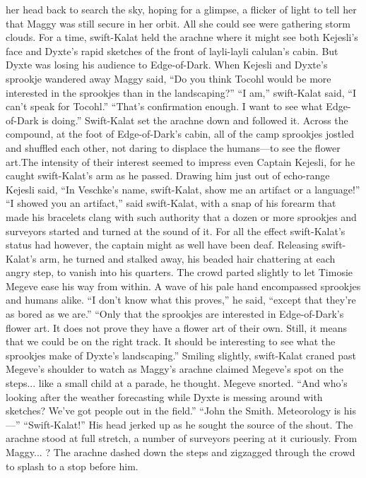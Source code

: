 \documentclass[9pt]{article}
\begin{document}
her head back to search the sky, hoping for a glimpse, a flicker of light to tell her that Maggy was still
secure in her orbit. All she could see were gathering storm clouds.
For a time, swift-Kalat held the arachne where it might see both Kejesli’s face and Dyxte’s rapid
sketches of the front of layli-layli calulan’s cabin. But Dyxte was losing his audience to Edge-of-Dark.
When Kejesli and Dyxte’s sprookje wandered away Maggy said, “Do you think Tocohl would be
more interested in the sprookjes than in the landscaping?”
“I am,” swift-Kalat said, “I can’t speak for Tocohl.”
“That’s confirmation enough. I want to see what Edge-of-Dark is doing.”
Swift-Kalat set the arachne down and followed it.
Across the compound, at the foot of Edge-of-Dark’s cabin, all of the camp sprookjes jostled and
shuffled each other, not daring to displace the humans—to see the flower art.The intensity of their interest seemed to impress even Captain Kejesli, for he caught swift-Kalat’s
arm as he passed. Drawing him just out of echo-range Kejesli said, “In Veschke’s name, swift-Kalat,
show me an artifact or a language!”
“I showed you an artifact,” said swift-Kalat, with a snap of his forearm that made his bracelets clang
with such authority that a dozen or more sprookjes and surveyors started and turned at the sound of it.
For all the effect swift-Kalat’s status had however, the captain might as well have been deaf. Releasing
swift-Kalat’s arm, he turned and stalked away, his beaded hair chattering at each angry step, to vanish
into his quarters.
The crowd parted slightly to let Timosie Megeve ease his way from within. A wave of his pale hand
encompassed sprookjes and humans alike. “I don’t know what this proves,” he said, “except that they’re
as bored as we are.”
“Only that the sprookjes are interested in Edge-of-Dark’s flower art. It does not prove they have a
flower art of their own. Still, it means that we could be on the right track. It should be interesting to see
what the sprookjes make of Dyxte’s landscaping.” Smiling slightly, swift-Kalat craned past Megeve’s
shoulder to watch as Maggy’s arachne claimed Megeve’s spot on the steps... like a small child at a
parade, he thought.
Megeve snorted. “And who’s looking after the weather forecasting while Dyxte is messing around
with sketches? We’ve got people out in the field.”
“John the Smith. Meteorology is his—”
“Swift-Kalat!”
His head jerked up as he sought the source of the shout. The arachne stood at full stretch, a number
of surveyors peering at it curiously. From Maggy... ?
The arachne dashed down the steps and zigzagged through the crowd to splash to a stop before him.
\end{document}
